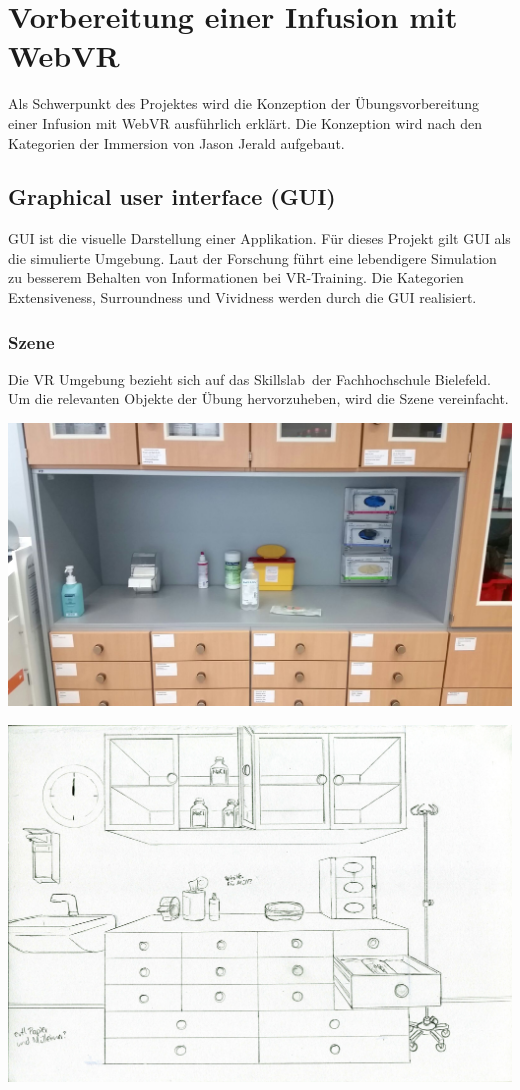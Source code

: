 \section{Vorbereitung einer Infusion mit WebVR}

Als Schwerpunkt des Projektes wird die Konzeption der Übungsvorbereitung einer Infusion mit WebVR ausführlich erklärt. Die Konzeption wird nach den Kategorien der Immersion von Jason Jerald\citep{28} aufgebaut.

 \subsection{Graphical user interface (GUI)}
 GUI ist die visuelle Darstellung einer Applikation. Für dieses Projekt gilt GUI als die simulierte Umgebung. Laut der Forschung führt eine lebendigere Simulation zu besserem Behalten von Informationen bei VR-Training. \citep{27} Die Kategorien Extensiveness, Surroundness und Vividness werden durch die GUI realisiert.
 
  \subsubsection{Szene}
  Die VR Umgebung bezieht sich auf das \glqq Skillslab\grqq\ der Fachhochschule Bielefeld. Um die relevanten Objekte der Übung hervorzuheben, wird die Szene vereinfacht.
  
  \includegraphics[width=\textwidth]{images/RealLabor.jpg}
  
  \includegraphics[width=\textwidth]{images/paperPrototype2.jpg}
  
